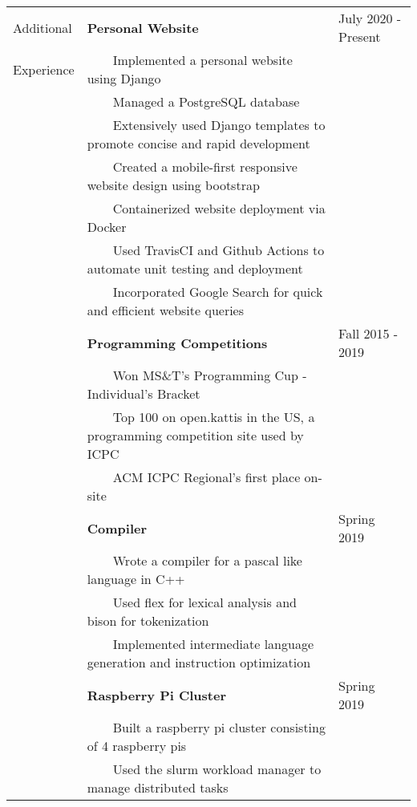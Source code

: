 \documentclass[10.5pt, arial]{article}
\newcommand{\tabitem}{~~\llap{\textbullet}~~}
\begin{document}
\begin{tabular}{p{1.5cm} p{13.2cm} l}
    Additional  & \textbf{Personal Website}                                     & July 2020 - Present \\
    Experience  & \tabitem Implemented a personal website using Django             & \\
                & \tabitem Managed a PostgreSQL database                        & \\
                & \tabitem Extensively used Django templates to promote concise and rapid development & \\ 
                & \tabitem Created a mobile-first responsive website design using bootstrap & \\
                & \tabitem Containerized website deployment via Docker          & \\
                & \tabitem Used TravisCI and Github Actions to automate unit testing and deployment & \\
                & \tabitem Incorporated Google Search for quick and efficient website queries & \\

                & \textbf{Programming Competitions}                             & Fall 2015 - 2019  \\
                & \tabitem Won MS\&T's Programming Cup - Individual's Bracket            &           \\
                & \tabitem Top 100 on open.kattis in the US, a programming competition site used by ICPC                   &           \\
                & \tabitem ACM ICPC Regional's first place on-site                       &           \\

                & \textbf{Compiler}                                             & Spring 2019 \\
                & \tabitem Wrote a compiler for a pascal like language in C++     & \\
                & \tabitem Used flex for lexical analysis and bison for tokenization                    & \\
                & \tabitem Implemented intermediate language generation and instruction optimization    & \\

                & \textbf{Raspberry Pi Cluster}                                 & Spring 2019 \\
                & \tabitem Built a raspberry pi cluster consisting of 4 raspberry pis & \\
                & \tabitem Used the slurm workload manager to manage distributed tasks & \\


\end{tabular}
\end{document}
